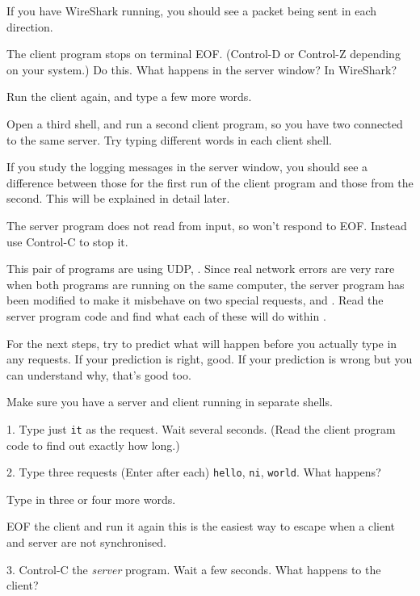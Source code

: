 If you have WireShark running, you should see a packet being sent in each direction.

The client program stops on terminal EOF. (Control-D or Control-Z depending on your
system.) Do this. What happens in the server window? In WireShark?

Run the client again, and type a few more words.

Open a third shell, and run a second client program, so you have two connected to the
same server. Try typing different words in each client shell.

\begin{IMPORTANT}
If you study the logging messages in the server window, you should see a difference
between those for the first run of the client program and those from the second.
This will be explained in detail later.
\end{IMPORTANT}

The server program does not read from input, so won't respond to EOF. Instead use
Control-C to stop it.



This pair of programs are using UDP, . Since real
network errors are very rare when both programs are running on the same computer,
the server program has been modified to make it misbehave on two special requests,
 and . Read the server program code and find what each of these will
do within .

\begin{IMPORTANT}
For the next steps, try to predict what will happen before you actually type in any
requests. If your prediction is right, good. If your prediction is wrong but you
can understand why, that's good too.
\end{IMPORTANT}

Make sure you have a server and client running in separate shells.

1. Type just \texttt{it} as the request. Wait several seconds. (Read the client program
code to find out exactly how long.)

2. Type three requests (Enter after each) \texttt{hello}, \texttt{ni}, \texttt{world}.
What happens?

Type in three or four more words.

EOF the client and run it again \DSH this is the easiest way to escape when
a client and server are not synchronised.

3. Control-C the \emph{server} program. Wait a few seconds. What happens to the client?


